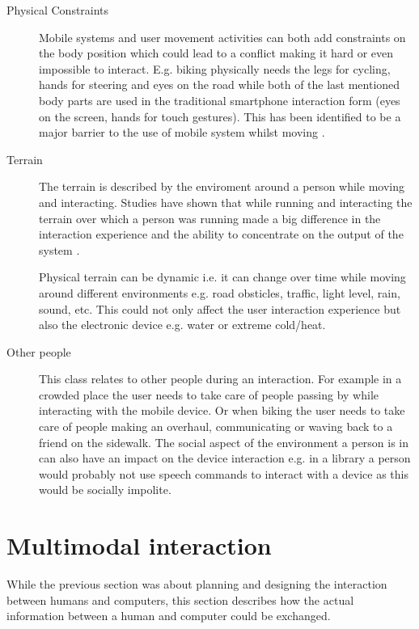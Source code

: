 \begin{description}
\item[Physical Constraints]
Mobile systems and user movement activities can both add constraints on the body position which could lead to a conflict making it hard or even impossible to interact. E.g. biking physically needs the legs for cycling, hands for steering and eyes on the road while both of the last mentioned body parts are used in the traditional smartphone interaction form (eyes on the screen, hands for touch gestures). This has been identified to be a major barrier to the use of mobile system whilst moving \cite{pielot_pocketmenu:_2012}.

\item[Terrain]
The terrain is described by the enviroment around a person while moving and interacting. Studies have shown that while running and interacting the terrain over which a person was running made a big difference in the interaction experience and the ability to concentrate on the output of the system \cite{marshall_using_2011}.

Physical terrain can be dynamic i.e. it can change over time while moving around different environments e.g. road obsticles, traffic, light level, rain, sound, etc. This could not only affect the user interaction experience but also the electronic device e.g. water or extreme cold/heat.

\item[Other people]
This class relates to other people during an interaction. For example in a crowded place the user needs to take care of people passing by while interacting with the mobile device. Or when biking the user needs to take care of people making an overhaul, communicating or waving back to a friend on the sidewalk. The social aspect of the environment a person is in can also have an impact on the device interaction e.g. in a library a person would probably not use speech commands to interact with a device as this would be socially impolite.
\end{description}


\section{Multimodal interaction}
While the previous section was about planning and designing the interaction between humans and computers, this section describes how the actual information between a human and computer could be exchanged. 

